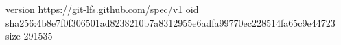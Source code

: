 version https://git-lfs.github.com/spec/v1
oid sha256:4b8e7f0f306501ad8238210b7a8312955e6adfa99770ec228514fa65c9e44723
size 291535
